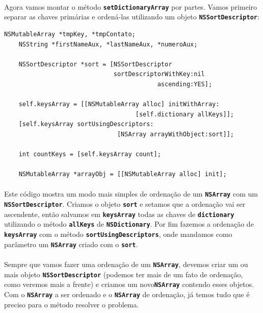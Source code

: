 \documentclass[a4paper,12pt,brazil,doubleside]{book}
\begin{document}
\paragraph{}Agora vamos montar o método \texttt{\textbf{setDictionaryArray}} por partes. Vamos primeiro separar as chaves primárias e ordená-las utilizando um objeto \texttt{\textbf{NSSortDescriptor}}:

\begin{listing}
\begin{verbatim}
NSMutableArray *tmpKey, *tmpContato;
    NSString *firstNameAux, *lastNameAux, *numeroAux;
    
    NSSortDescriptor *sort = [NSSortDescriptor
                              sortDescriptorWithKey:nil
                                          ascending:YES];
    
    self.keysArray = [[NSMutableArray alloc] initWithArray:
                                    [self.dictionary allKeys]];
    [self.keysArray sortUsingDescriptors:
                               [NSArray arrayWithObject:sort]];
    
    int countKeys = [self.keysArray count];

    NSMutableArray *arrayObj = [[NSMutableArray alloc] init];
\end{verbatim}
\end{listing}

\paragraph{}Este código mostra um modo mais simples de ordenação de um \texttt{\textbf{NSArray}} com um \texttt{\textbf{NSSortDescriptor}}. Criamos o objeto \texttt{\textbf{sort}} e setamos que a ordenação vai ser ascendente, então salvamos em \texttt{\textbf{keysArray}} todas as chaves de \texttt{\textbf{dictionary}} utilizando o método \texttt{\textbf{allKeys}} de \texttt{\textbf{NSDictionary}}. Por fim fazemos a ordenação de \texttt{\textbf{keysArray}} com o método \texttt{\textbf{sortUsingDescriptors}}, onde mandamos como parâmetro um \texttt{\textbf{NSArray}} criado com o \texttt{\textbf{sort}}.
\paragraph{}Sempre que vamos fazer uma ordenação de um \texttt{\textbf{NSArray}}, devemos criar um ou mais objeto \texttt{\textbf{NSSortDescriptor}} (podemos ter mais de um fato de ordenação, como veremos mais a frente) e criamos um novo\texttt{\textbf{NSArray}} contendo esses objetos. Com o \texttt{\textbf{NSArray}} a ser ordenado e o \texttt{\textbf{NSArray}} de ordenação, já temos tudo que é preciso para o método resolver o problema.
\end{document}
